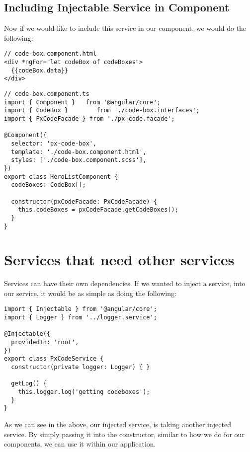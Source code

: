 \subsection{ Including Injectable Service in Component }
Now if we would like to include this service in our component, we would do the
following:
\begin{lstlisting}
// code-box.component.html
<div *ngFor="let codeBox of codeBoxes">
  {{codeBox.data}}
</div>
\end{lstlisting}

\begin{lstlisting}[caption=Include Injectable Service in Component]
// code-box.component.ts
import { Component }   from '@angular/core';
import { CodeBox }        from './code-box.interfaces';
import { PxCodeFacade } from './px-code.facade';

@Component({
  selector: 'px-code-box',
  template: './code-box.component.html',
  styles: ['./code-box.component.scss'],
})
export class HeroListComponent {
  codeBoxes: CodeBox[];

  constructor(pxCodeFacade: PxCodeFacade) {
    this.codeBoxes = pxCodeFacade.getCodeBoxes();
  }
}
\end{lstlisting}


\section{Services that need other services}
Services can have their own dependencies. If we wanted to inject a service, into
our service, it would be as simple as doing the following:
\begin{lstlisting}
import { Injectable } from '@angular/core';
import { Logger } from '../logger.service';

@Injectable({
  providedIn: 'root',
})
export class PxCodeService {
  constructor(private logger: Logger) { }

  getLog() {
    this.logger.log('getting codeboxes');
  }
}
\end{lstlisting}

As we can see in the above, our injected service, is taking another injected
service. By simply passing it into the constructor, similar to how we do for our
components, we can use it within our application.

